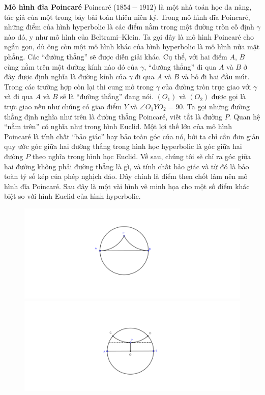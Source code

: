 \begin{multicols}{2}
	\textbf{\color{lichsutoanhoc}Mô hình đĩa Poincar\'e}
	\vskip 0.1cm
	Poincaré ($1854-1912$) là một nhà toán học đa năng, tác giả của một trong bảy bài toán thiên niên kỷ. Trong mô hình đĩa Poincaré, những điểm của hình hyperbolic là các điểm nằm trong một đường tròn cố định $\gamma$ nào đó, y như mô hình của Beltrami--Klein. Ta gọi đây là mô hình Poincar\'e cho ngắn gọn, dù ông còn một mô hình khác của hình hyperbolic là mô hình nửa mặt phẳng. 
	\vskip 0.1cm
	Các ``đường thẳng'' sẽ được diễn giải khác. Cụ thể, với hai điểm $A$, $B$ cùng nằm trên một đường kính nào đó của $\gamma$, ``đường thẳng'' đi qua $A$ và $B$ ở đây được định nghĩa là đường kính của $\gamma$ đi qua $A$ và $B$ và bỏ đi hai đầu mút. Trong các trường hợp còn lại thì cung mở trong $\gamma$ của đường tròn trực giao với $\gamma$ và đi qua $A$ và $B$ sẽ là ``đường thẳng'' đang nói. $(O_1)$ và $(O_2)$ được gọi là trực giao nếu như chúng có giao điểm $Y$ và $ \angle O_1YO_2 = 90$. Ta gọi những đường thẳng định nghĩa như trên là đường thẳng Poincaré, viết tắt là đường $P$. 
	\vskip 0.1cm
	Quan hệ ``nằm trên'' có nghĩa như trong hình Euclid. Một lợi thế lớn của mô hình Poincar\'e là tính chất ``bảo giác'' hay bảo toàn góc của nó, bởi ta chỉ cần đơn giản quy ước góc giữa hai đường thẳng trong hình học hyperbolic là góc giữa hai đường  $P$ theo nghĩa trong hình học Euclid. Về sau, chúng tôi sẽ chỉ ra góc giữa hai đường không phải đường thẳng là gì, và tính chất bảo giác và từ đó là bảo toàn tỷ số kép của phép nghịch đảo. Đây chính là điểm then chốt làm nên mô hình đĩa Poincar\'e.
	\vskip 0.1cm
	Sau đây là một vài hình vẽ minh họa cho một số điểm khác biệt so với hình Euclid của hình hyperbolic.	
	\begin{figure}[H]
		\vspace*{-10pt}
		\centering
		\captionsetup{labelformat= empty, justification=centering}
		\includegraphics[height= 0.43\linewidth]{Duong_song_song_gioi_han_Poincare.pdf}
		\includegraphics[height= 0.43\linewidth]{Duong_song_song_phan_ky.pdf}

\end{figure}
\end{multicols}
